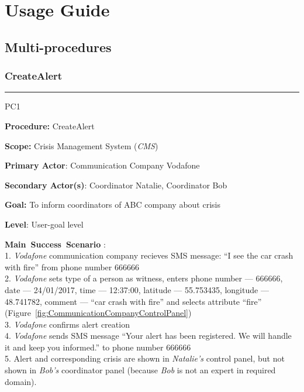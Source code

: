 \chapter{Usage Guide}
\label{chap:usage_guide}

\section{Multi-procedures}

\subsection{CreateAlert}
\vspace{0.5cm}
\hrule
\begin{lyxlist}{PC1}
\small{
\item [\textbf{Procedure:}] CreateAlert
\item [\textbf{Scope:}] Crisis Management System (\emph{CMS})
\item [\textbf{Primary Actor}:] Communication Company Vodafone
\item [\textbf{Secondary Actor(s)}:] Coordinator Natalie, Coordinator Bob
\item [\textbf{Goal:}] To inform coordinators of ABC company about crisis
\item [\textbf{Level}:] User-goal level

\item [\textbf{Main~Success~Scenario}]:\\
1. \emph{Vodafone} communication company recieves SMS message: ``I see the car crash
with fire'' from phone number 666666\\
2. \emph{Vodafone} sets type of a person as witness, enters phone
number --- 666666, date --- 24/01/2017, time --- 12:37:00, latitude
\hspace*{0.4cm} --- 55.753435, longitude --- 48.741782, comment --- ``car crash
with fire'' and selects attribute ``fire'' (Figure~\ref{fig:CommunicationCompanyControlPanel})\\
3. \emph{Vodafone} confirms alert creation\\
4. \emph{Vodafone} sends SMS message ``Your alert has been registered.
We will handle it and keep you informed.'' to phone number \hspace*{0.4cm}
666666\\
5. Alert and corresponding crisis are shown in \emph{Natalie's} control panel,
but not shown in \emph{Bob’s} coordinator panel (because
\hspace*{0.4cm} \emph{Bob} is not an expert in required domain).

}
\end{lyxlist}
